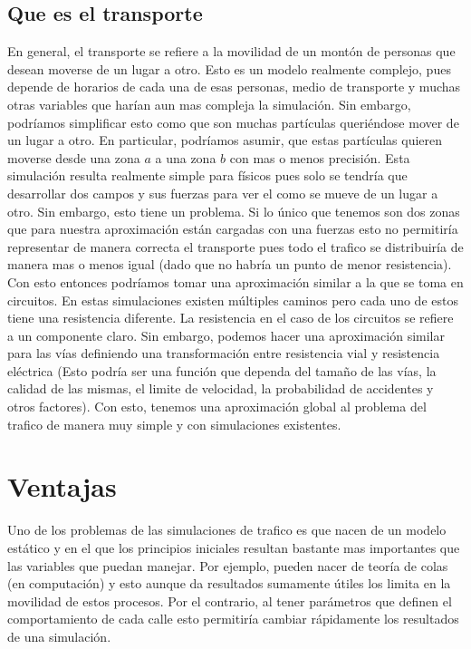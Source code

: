 \documentclass[12pt]{exam}
\begin{document}
\subsection{Que es el transporte}

En general, el transporte se refiere a la movilidad de un montón de personas que desean moverse de un lugar a otro. Esto es un modelo realmente complejo, pues depende de horarios de cada una de esas personas, medio de transporte y muchas otras variables que harían aun mas compleja la simulación. Sin embargo, podríamos simplificar esto como que son muchas partículas queriéndose mover de un lugar a otro. En particular, podríamos asumir, que estas partículas quieren moverse desde una zona $a$ a una zona $b$ con mas o menos precisión. Esta simulación resulta realmente simple para físicos pues solo se tendría que desarrollar dos campos y sus fuerzas para ver el como se mueve de un lugar a otro. Sin embargo, esto tiene un problema. Si lo único que tenemos son dos zonas que para nuestra aproximación están cargadas con una fuerzas esto no permitiría representar de manera correcta el transporte pues todo el trafico se distribuiría de manera mas o menos igual (dado que no habría un punto de menor resistencia). Con esto entonces podríamos tomar una aproximación similar a la que se toma en circuitos. En estas simulaciones existen múltiples caminos pero cada uno de estos tiene una resistencia diferente. La resistencia en el caso de los circuitos se refiere a un componente claro. Sin embargo, podemos hacer una aproximación similar para las vías definiendo una transformación entre resistencia vial y resistencia eléctrica (Esto podría ser una función que dependa del tamaño de las vías, la calidad de las mismas, el limite de velocidad, la probabilidad de accidentes y otros factores). Con esto, tenemos una aproximación global al problema del trafico de manera muy simple y con simulaciones existentes.

\section{Ventajas}

Uno de los problemas de las simulaciones de trafico es que nacen de un modelo estático y en el que los principios iniciales resultan bastante mas importantes que las variables que puedan manejar. Por ejemplo, pueden nacer de teoría de colas (en computación) \cite{simulacion} y esto aunque da resultados sumamente útiles los limita en la movilidad de estos procesos. Por el contrario, al tener parámetros que definen el comportamiento de cada calle esto permitiría cambiar rápidamente los resultados de una simulación. 
\end{document}
